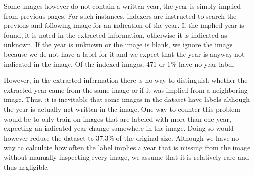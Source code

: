 Some images however do not contain a written year, the year is simply implied from previous pages. For such instances, indexers are instructed to search the previous and following image for an indication of the year. If the implied year is found, it is noted in the extracted information, otherwise it is indicated as unknown.
If the year is unknown or the image is blank, we ignore the image because we do not have a label for it and we expect that the year is anyway not indicated in the image. Of the indexed images, $471$ or $1\%$ have no year label.

However, in the extracted information there is no way to distinguish whether the extracted year came from the same image or if it was implied from a neighboring image. Thus, it is inevitable that some images in the dataset have labels although the year is actually not written in the image. One way to counter this problem would be to only train on images that are labeled with more than one year, expecting an indicated year change somewhere in the image. Doing so would however reduce the dataset to $37.3\%$ of the original size.
Although we have no way to calculate how often the label implies a year that is missing from the image without manually inspecting every image, we assume that it is relatively rare and thus negligible.
